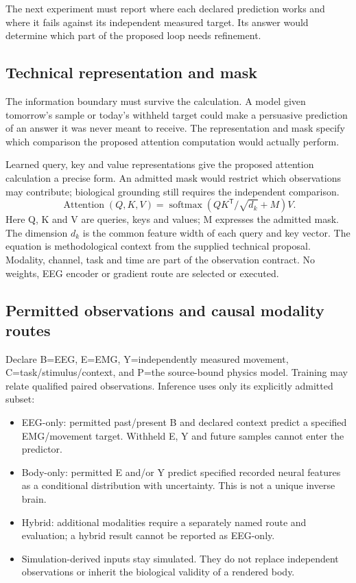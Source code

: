 The next experiment must report where each declared prediction works and where
it fails against its independent measured target. Its answer would determine
which part of the proposed loop needs refinement.

\subsection{Technical representation and mask}
The information boundary must survive the calculation. A model given tomorrow's
sample or today's withheld target could make a persuasive prediction of an
answer it was never meant to receive. The representation and mask specify
which comparison the proposed attention computation would actually perform.

Learned query, key and value representations give the proposed attention
calculation a precise form. An admitted mask would restrict which observations
may contribute; biological grounding still requires the independent comparison.
\[\operatorname{Attention}(Q,K,V)=\operatorname{softmax}\!\left(QK^{\mathsf{T}}/\sqrt{d_k}+M\right)V.\]
Here Q, K and V are queries, keys and values; M expresses the admitted mask. The dimension $d_k$ is the common feature width of each query and key vector. The equation is methodological context from the supplied technical proposal. Modality, channel, task and time are part of the observation contract. No weights, EEG encoder or gradient route are selected or executed.

\subsection{Permitted observations and causal modality routes}
Declare B=EEG, E=EMG, Y=independently measured movement, C=task/stimulus/context, and P=the source-bound physics model. Training may relate qualified paired observations. Inference uses only its explicitly admitted subset:

\begin{itemize}
\item EEG-only: permitted past/present B and declared context predict a specified   EMG/movement target. Withheld E, Y and future samples cannot enter the predictor.
\item Body-only: permitted E and/or Y predict specified recorded neural features as   a conditional distribution with uncertainty. This is not a unique inverse brain.
\item Hybrid: additional modalities require a separately named route and evaluation;   a hybrid result cannot be reported as EEG-only.
\item Simulation-derived inputs stay simulated. They do not replace independent   observations or inherit the biological validity of a rendered body.
\end{itemize}

